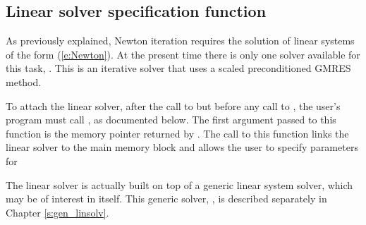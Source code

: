 
\subsection{Linear solver specification function}\label{ss:lin_solv_init}

As previously explained, Newton iteration requires the solution of
linear systems of the form (\ref{e:Newton}).  At the present time
there is only one solver available for this task, {\kinspgmr}. 
This is an iterative solver that uses a scaled preconditioned
GMRES method.

To attach the {\kinspgmr} linear solver, after the call to 
but before any call to , the user's program must call  ,
as documented below. The first argument passed to this function is the {\kinsol}
memory pointer returned by .  The call to this
function links the linear solver to the main {\kinsol} memory block and
allows the user to specify parameters for {\kinspgmr}

The {\kinspgmr} linear solver is actually built on top of a generic
linear system solver, which may be of interest in itself.  This generic
solver, {\spgmr}, is described separately in Chapter \ref{s:gen_linsolv}.


